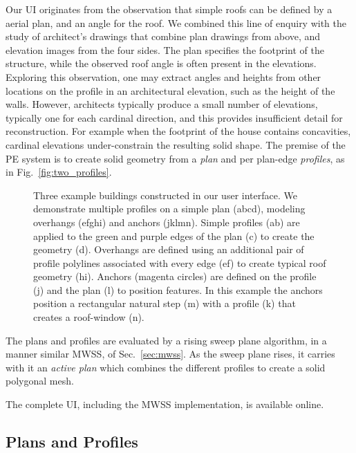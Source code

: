 Our UI originates from the observation that simple roofs can be defined by a aerial plan, and an angle for the roof. We combined this line of enquiry with the study of architect's drawings that combine plan drawings from above, and elevation images from the four sides. The plan specifies the footprint of the structure, while the observed roof angle is often present in the elevations. Exploring this observation, one may extract angles and heights from other locations on the profile in an architectural elevation, such as the height of the walls. However, architects typically produce a small number of elevations, typically one for each cardinal direction, and this provides insufficient detail for reconstruction. For example when the footprint of the house contains concavities, cardinal elevations under-constrain the resulting solid shape. The premise of the PE system is to create solid geometry from a \emph{plan} and per plan-edge \emph{profiles}, as in Fig.~\ref{fig:two_profiles}. 


\begin{figure}
  \centering
 \def\svgwidth{1.0\columnwidth}

\caption[Example PE plans and profiles.]{\label{fig:ui_strip} Three example buildings constructed in our user interface. We demonstrate multiple profiles on a simple plan (abcd), modeling overhangs (efghi) and anchors (jklmn). Simple profiles (ab) are applied to the green and purple edges of the plan (c) to create the geometry (d). Overhangs are defined using an additional pair of profile polylines associated with every edge (ef) to create typical roof geometry (hi). Anchors (magenta circles) are defined on the profile (j) and the plan (l) to position features. In this example the anchors position a rectangular natural step (m) with a profile (k) that creates a roof-window (n).
}
\end{figure}

The plans and profiles are evaluated by a rising sweep plane algorithm, in a manner similar MWSS, of Sec.~\ref{sec:mwss}. As the sweep plane rises, it carries with it an \emph{active plan} which combines the different profiles to create a solid polygonal mesh. 


The complete UI, including the MWSS implementation, is available online\cite{siteplan}.


\subsection{Plans and Profiles}

